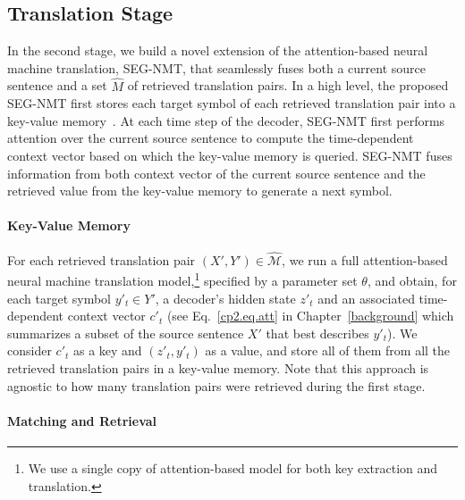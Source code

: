 \subsection{Translation Stage} 
In the second stage, we build a novel extension of the attention-based neural machine translation, SEG-NMT, that seamlessly fuses both a current source sentence and a set $\hat{M}$ of retrieved translation pairs. In a high level, the proposed SEG-NMT first stores each target symbol of each retrieved translation pair into a key-value memory~\citep{miller2016key}. At each time step of the decoder, SEG-NMT first performs attention over the current source sentence to compute the time-dependent context vector based on which the key-value memory is queried. SEG-NMT fuses information from both context vector of the current source sentence and the retrieved value from the key-value memory to generate a next symbol. 

\paragraph{Key-Value Memory}

For each retrieved translation pair $(X', Y') \in \hat{\mathcal{M}}$, we run a full attention-based neural machine translation model,\footnote{
We use a single copy of attention-based model for both key extraction and translation.
}
specified by a parameter set $\theta$, and obtain, for each target symbol $y'_t \in Y'$, a decoder's hidden state $z'_t$ and an associated time-dependent context vector $c'_t$ (see Eq.~\eqref{cp2.eq.att} in Chapter~\ref{background} which summarizes a subset of the source sentence $X'$ that best describes $y'_t$). We consider $c'_t$ as a key and $(z'_t, y'_t)$ as a value, and store all of them from all the retrieved translation pairs in a key-value memory. Note that this approach is agnostic to how many translation pairs were retrieved during the first stage.


\paragraph{Matching and Retrieval}

